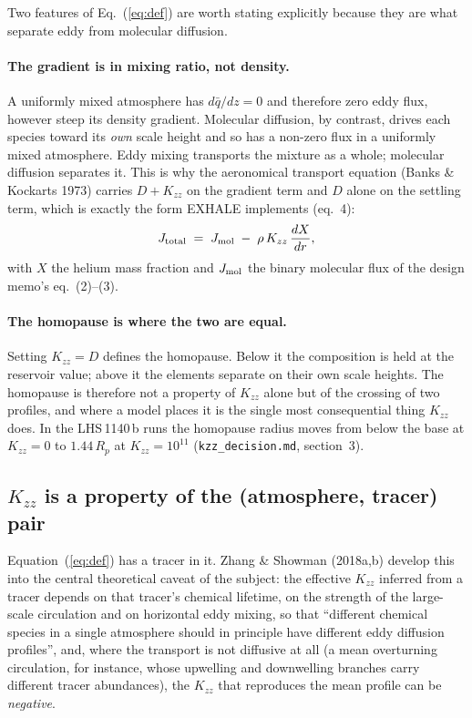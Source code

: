 \documentclass[english,a4paper]{my_memo}
\begin{document}
Two features of Eq.~(\ref{eq:def}) are worth stating explicitly because
they are what separate eddy from molecular diffusion.

\paragraph{The gradient is in mixing ratio, not density.} A uniformly mixed
atmosphere has $d\bar q/dz = 0$ and therefore zero eddy flux, however steep
its density gradient. Molecular diffusion, by contrast, drives each species
toward its \emph{own} scale height and so has a non-zero flux in a uniformly
mixed atmosphere. Eddy mixing transports the mixture as a whole; molecular
diffusion separates it. This is why the aeronomical transport equation
(Banks \& Kockarts 1973) carries $D+K_{zz}$ on the gradient term and $D$
alone on the settling term, which is exactly the form EXHALE implements
(eq.~4):
%
\begin{equation}
  J_{\rm total} \;=\; J_{\rm mol} \;-\; \rho\,K_{zz}\,\frac{dX}{dr},
  \label{eq:DplusK}
\end{equation}
%
with $X$ the helium mass fraction and $J_{\rm mol}$ the binary molecular
flux of the design memo's eq.~(2)--(3).

\paragraph{The homopause is where the two are equal.} Setting
$K_{zz} = D$ defines the homopause. Below it the composition is held at the
reservoir value; above it the elements separate on their own scale heights.
The homopause is therefore not a property of $K_{zz}$ alone but of the
crossing of two profiles, and where a model places it is the single most
consequential thing $K_{zz}$ does. In the LHS\,1140\,b runs the homopause
radius moves from below the base at $K_{zz} = 0$ to $1.44\,R_p$ at
$K_{zz} = 10^{11}$ (\texttt{kzz\_decision.md}, section~3).

\subsection{$K_{zz}$ is a property of the (atmosphere, tracer) pair}
\label{sec:zs}

Equation~(\ref{eq:def}) has a tracer in it. Zhang \& Showman (2018a,b)
develop this into the central theoretical caveat of the subject: the
effective $K_{zz}$ inferred from a tracer depends on that tracer's chemical
lifetime, on the strength of the large-scale circulation and on horizontal
eddy mixing, so that ``different chemical species in a single atmosphere
should in principle have different eddy diffusion profiles'', and, where the
transport is not diffusive at all (a mean overturning circulation, for
instance, whose upwelling and downwelling branches carry different tracer
abundances), the $K_{zz}$ that reproduces the mean profile can be
\emph{negative}.
\end{document}
